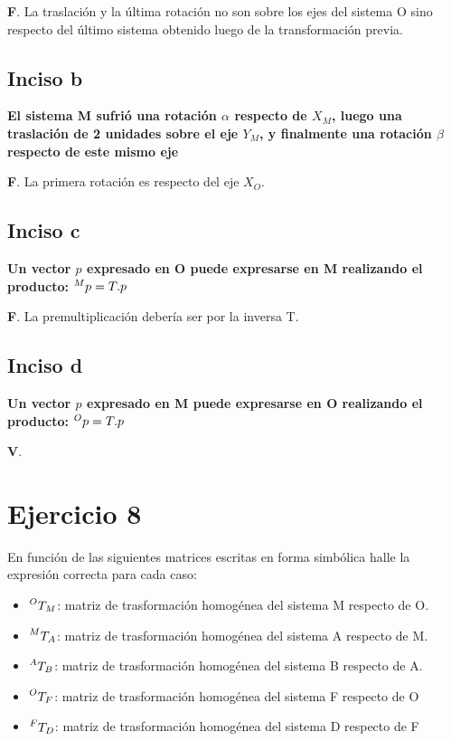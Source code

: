 \documentclass[a4paper,12pt]{article}
\begin{document}
\textbf{F}. La traslación y la última rotación no son sobre los ejes del sistema {O} sino respecto del último sistema obtenido luego de la transformación previa.

\subsection{Inciso b}
\textbf{El sistema {M} sufrió una rotación $\alpha$ respecto de $X_M$, luego una traslación de 2
unidades sobre el eje $Y_M$, y finalmente una rotación $\beta$ respecto de este mismo eje}
\vspace*{0.5 cm}

\textbf{F}. La primera rotación es respecto del eje $X_O$.

\subsection{Inciso c}
\textbf{Un vector $p$ expresado en {O} puede expresarse en {M} realizando el producto: $\prescript{M}{}{p} =
T. p$}
\vspace*{0.5 cm}

\textbf{F}. La premultiplicación debería ser por la inversa T.

\subsection{Inciso d}
\textbf{Un vector $p$ expresado en {M} puede expresarse en {O} realizando el producto: $\prescript{O}{}{p} =
T. p$}
\vspace*{0.5 cm}

\textbf{V}.

\section{Ejercicio 8}
En función de las siguientes matrices escritas en forma simbólica halle la expresión
correcta para cada caso:

\begin{itemize}
    \item $\prescript{O}{}{T_M}$: matriz de trasformación homogénea del sistema {M} respecto de {O}.
    \item $\prescript{M}{}{T_A}$: matriz de trasformación homogénea del sistema {A} respecto de {M}.
    \item $\prescript{A}{}{T_B}$: matriz de trasformación homogénea del sistema {B} respecto de {A}.
    \item $\prescript{O}{}{T_F}$: matriz de trasformación homogénea del sistema {F} respecto de {O}
    \item $\prescript{F}{}{T_D}$: matriz de trasformación homogénea del sistema {D} respecto de {F}
\end{itemize}
\end{document}
